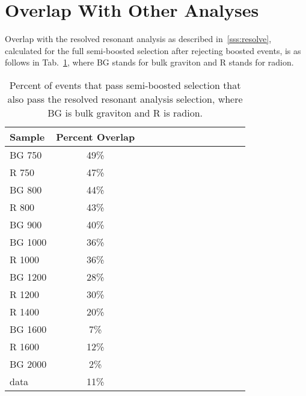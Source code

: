 \section{Overlap With Other Analyses\label{app:overlap}}
Overlap with the resolved resonant analysis as described in~\ref{sss:resolve}, calculated for the full semi-boosted selection after rejecting boosted events, is as follows in Tab.~\ref{tab:resoverlap}, where BG stands for bulk graviton and R stands for radion.
\begin{table}[h]
\begin{tabular}{|l|c|c|c|c|c|c|c|c|c|c|c|c|}
\hline
Sample & Percent Overlap \\ \hline
BG 750 & 49\%\\
R 750 & 47\%\\
BG 800 & 44\%\\
R 800 & 43\%\\
BG 900 & 40\%\\
BG 1000 & 36\%\\
R 1000 & 36\%\\
BG 1200 & 28\%\\
R 1200 & 30\%\\
R 1400 & 20\%\\
BG 1600 & 7\%\\
R 1600 & 12\%\\
BG 2000 & 2\%\\
data & 11\%\\
\hline
\end{tabular}
\caption{Percent of events that pass semi-boosted selection that also pass the resolved resonant analysis selection, where BG is bulk graviton and R is radion.}
\label{tab:resoverlap}
\end{table}
